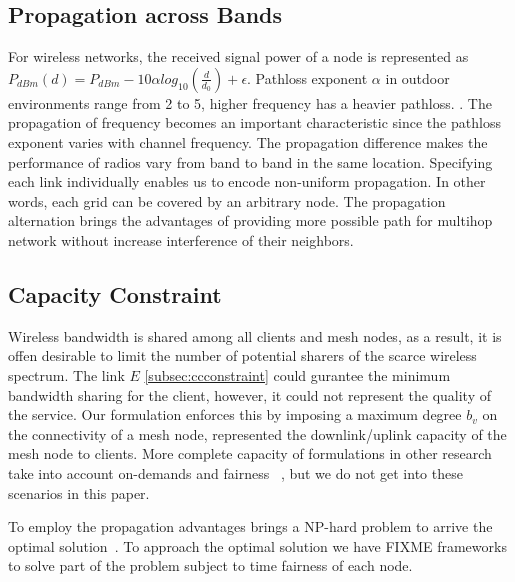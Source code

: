 \subsection{Propagation across Bands}
 For wireless networks, the received signal power of a node is represented as $P_{dBm}(d)=P_{dBm}-10\alpha log_{10}(\frac{d}{d_0})+\epsilon$. Pathloss exponent $\alpha$ in outdoor environments range from 2 to 5, higher frequency has a heavier pathloss. \cite{camp2006measurement}. 
The propagation of frequency becomes an important characteristic since the pathloss exponent varies with channel frequency. The propagation difference makes the performance of radios vary from band to band in the same location. 
Specifying each link individually enables us to encode non-uniform propagation. In other words, each grid can be covered by an arbitrary node.  
The propagation alternation brings the advantages of providing more possible path for multihop network without increase interference of their neighbors. 


\subsection{Capacity Constraint}
Wireless bandwidth is shared among all clients and mesh nodes, as a result, it is offen desirable to limit the number of potential sharers of the scarce wireless spectrum. 
The link $E$ \ref{subsec:ccconstraint} could gurantee the minimum bandwidth sharing for the client, however, it could not represent the quality of the service. Our formulation enforces this by imposing a maximum degree $b_v$ on the connectivity of a mesh node, represented the downlink/uplink capacity of the mesh node to clients. More complete capacity of formulations in other research take into account on-demands and fairness ~\cite{arkoulis2013optimal}, but we do not get into these scenarios in this paper.





To employ the propagation advantages brings a NP-hard problem to arrive the optimal solution~\cite{arkoulis2013optimal}. 
To approach the optimal solution we have FIXME frameworks to solve part of the problem subject to time fairness of each node.




